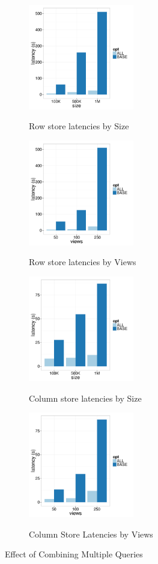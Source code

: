 \begin{figure}[t]
	\centering
	\begin{subfigure}{0.24\linewidth}
		\centering
		{\includegraphics[width=4.6cm] {Images/row_all_none_by_size.pdf}}
		\caption{Row store latencies by Size}
		\label{fig:row_all_none_size}
	\end{subfigure}
	\begin{subfigure}{0.24\linewidth}
		\centering
		{\includegraphics[width=4.6cm] {Images/row_all_none_by_views.pdf}}
		\caption{Row store latencies by Views}
		\label{fig:row_all_none_views}
	\end{subfigure}
	\begin{subfigure}{0.24\linewidth}
		\centering
		{\includegraphics[width=4.6cm] {Images/col_all_none_by_size.pdf}}
		\caption{Column store latencies by Size}
		\label{fig:col_all_none_size}
	\end{subfigure}
	\begin{subfigure}{0.24\linewidth}
		\centering
		{\includegraphics[width=4.6cm] {Images/col_all_none_by_views.pdf}}
		\caption{Column Store Latencies by Views}
		\label{fig:col_all_none_views}
	\end{subfigure}
	\caption{Effect of Combining Multiple Queries }
	\label{fig:all_opt}
\end{figure}


